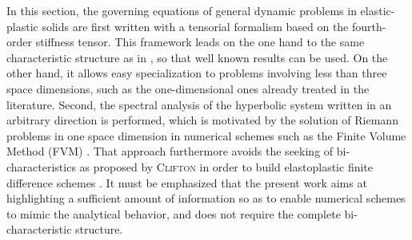In this section, the governing equations of general dynamic problems in elastic-plastic solids are first written with a tensorial formalism based on the fourth-order stiffness tensor.
This framework leads on the one hand to the same characteristic structure as in \cite{Raniecki,mandel_book}, so that well known results can be used.
On the other hand, it allows easy specialization to problems involving less than three space dimensions, such as the one-dimensional ones already treated in the literature.
%
Second, the spectral analysis of the hyperbolic system written in an arbitrary direction is performed, which is motivated by the solution of Riemann problems in one space dimension in numerical schemes such as the Finite Volume Method (FVM) \cite{Leveque,Toro}.
That approach furthermore avoids the seeking of bi-characteristics as proposed by \textsc{Clifton} in order to build elastoplastic finite difference schemes \cite{Clifton_thesis}.
It must be emphasized that the present work aims at highlighting a sufficient amount of information so as to enable numerical schemes to mimic the analytical behavior, and does not require the complete bi-characteristic structure.

